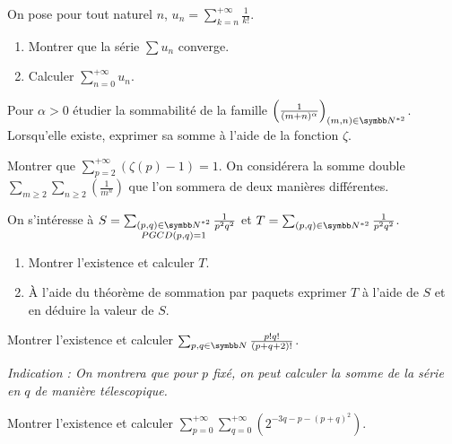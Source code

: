 \begin{exercice}
    On pose pour tout naturel $n$, $\displaystyle u_{n}=\sum_{k=n}^{+\infty}\frac{1}{k!}$.
    \begin{enumerate}
        \item Montrer que la série $\sum u_{n}$ converge.
        \item Calculer $\displaystyle \sum_{n=0}^{+\infty}u_{n}$.
    \end{enumerate}
\end{exercice}

\begin{exercice}
    Pour $\alpha>0$ étudier la sommabilité de la famille $\left(\frac{1}{(m+n)^{\alpha}}\right)_{(m,n)\in \N^{*2}}$.
    Lorsqu'elle existe, exprimer sa somme à l'aide de la fonction $\zeta$.
\end{exercice}

\begin{exercice}
    Montrer que $\displaystyle \sum_{p=2}^{+\infty}(\zeta(p)-1)=1$.
    On considérera la somme double $\sum_{m\geqslant2}\sum_{n\geqslant2}\left(\frac{1}{m^{n}}\right)$ que l'on sommera de deux manières différentes.
\end{exercice}

\begin{exercice}
    On s'intéresse à $S=\sum_{\substack{(p,q)\in\N^{*2} \\ PGCD(p,q)=1}}\frac{1}{p^{2}q^{2}}$ et $T=\sum_{(p,q)\in\N^{*2}}\frac{1}{p^{2}q^{2}}$.
    \begin{enumerate}
        \item Montrer l'existence et calculer $T$.
        \item À l'aide du théorème de sommation par paquets exprimer $T$ à l'aide de $S$ et en déduire la valeur de $S$.
    \end{enumerate}
\end{exercice}

\begin{exercice}
    Montrer l'existence et calculer $\sum_{p,q\in \N}\frac{p!q!}{(p+q+2)!}$.

    \textit{Indication : On montrera que pour $p$ fixé, on peut calculer la somme de la série en $q$ de manière télescopique.}
\end{exercice}

\begin{exercice}
    Montrer l'existence et calculer $\displaystyle \sum_{p=0}^{+\infty}\sum_{q=0}^{+\infty}\left(2^{-3q-p-(p+q)^{2}}\right)$.
\end{exercice}

